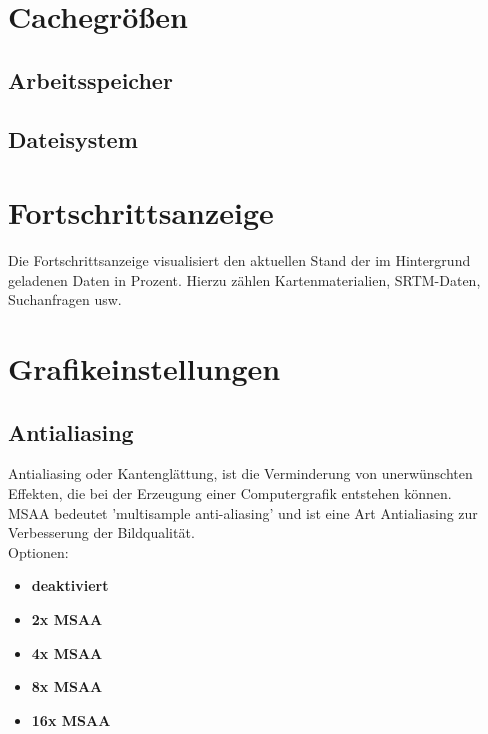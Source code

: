 \documentclass[10pt]{scrreprt}
\begin{document}
\section{Cachegrößen} 

\vspace{3mm}
\subsection{Arbeitsspeicher}  

\vspace{3mm}
\subsection{Dateisystem}  



\vspace{3mm}
\section{Fortschrittsanzeige} 
Die Fortschrittsanzeige visualisiert den aktuellen Stand der im Hintergrund geladenen Daten in Prozent. Hierzu zählen Kartenmaterialien, SRTM-Daten, Suchanfragen usw.



\vspace{3mm}
\section{Grafikeinstellungen} 

\vspace{3mm}
\subsection{Antialiasing}  

Antialiasing oder Kantenglättung, ist die Verminderung von unerwünschten Effekten, die bei der Erzeugung einer Computergrafik entstehen können.\\

MSAA bedeutet 'multisample anti-aliasing' und ist eine Art Antialiasing zur Verbesserung der Bildqualität.\\

Optionen:
\begin{itemize}
\item \textbf{deaktiviert}
\item \textbf{2x MSAA}
\item \textbf{4x MSAA}
\item \textbf{8x MSAA}
\item \textbf{16x MSAA}
\end{itemize}
\end{document}
